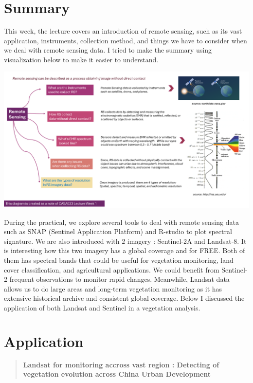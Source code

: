 \documentclass[
  letterpaper,
  DIV=11,
  numbers=noendperiod]{scrreprt}
\begin{document}
\hypertarget{summary}{%
\section{\texorpdfstring{\textbf{Summary}}{Summary}}\label{summary}}

This week, the lecture covers an introduction of remote sensing, such as
its vast application, instruments, collection method, and things we have
to consider when we deal with remote sensing data. I tried to make the
summary using visualization below to make it easier to understand.

\includegraphics{images/clipboard-1084697230.png}

During the practical, we explore several tools to deal with remote
sensing data such as SNAP (Sentinel Application Platform) and R-studio
to plot spectral signature. We are also introduced with 2 imagery :
Sentinel-2A and Landsat-8. It is interesting how this two imagery has a
global coverage and for FREE. Both of them has spectral bands that could
be useful for vegetation monitoring, land cover classification, and
agricultural applications. We could benefit from Sentinel-2 frequent
observations to monitor rapid changes. Meanwhile, Landsat data allows us
to do large areas and long-term vegetation monitoring as it has
extensive historical archive and consistent global coverage. Below I
discussed the application of both Landsat and Sentinel in a vegetation
analysis.

\hypertarget{application}{%
\section{\texorpdfstring{\textbf{Application}}{Application}}\label{application}}

\begin{quote}
\textbf{Landsat for monitoring accross vast region : Detecting of
vegetation evolution across China Urban Development}
\end{quote}
\end{document}
